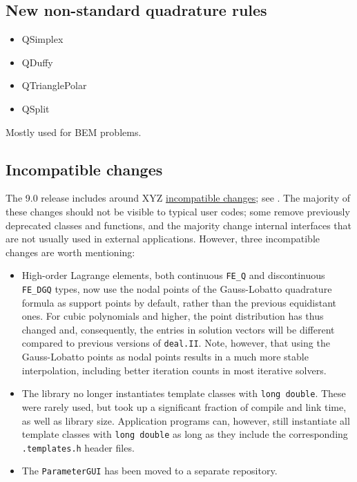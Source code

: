 \documentclass{ansarticle-preprint}
\newcommand{\specialword}[1]{\texttt{#1}}
\newcommand{\dealii}{{\specialword{deal.II}}}
\begin{document}
\subsection{New non-standard quadrature rules}

\begin{itemize}
\item QSimplex
\item QDuffy
\item QTrianglePolar
\item QSplit
\end{itemize}

Mostly used for BEM problems.

\subsection{Incompatible changes}

The 9.0 release includes around XYZ
\href{https://www.dealii.org/developer/doxygen/deal.II/changes_between_8_5_and_9_0.html}{
incompatible changes}; see \cite{changes90}. The majority of these changes
should not be visible to typical user codes; some remove previously
deprecated classes and functions, and the majority change internal
interfaces that are not usually used in external applications. However, three
incompatible changes are worth mentioning:
\begin{itemize}
  \item High-order Lagrange elements, both continuous \verb!FE_Q! and
    discontinuous \verb!FE_DGQ! types, now use the nodal points of the
    Gauss-Lobatto quadrature formula as support points by default, rather than the
    previous equidistant ones. For cubic polynomials and higher, the point
    distribution has thus changed and, consequently, the entries in
    solution vectors will be different compared to previous
    versions of \dealii{}. Note, however, that using the Gauss-Lobatto points as nodal
    points results in a much more stable interpolation, including better
    iteration counts in most iterative solvers.
  \item
    The library no longer instantiates template classes with \texttt{long
    double}. These were rarely used, but took up a significant
    fraction of compile and link time, as well as library
    size. Application programs can, however, still instantiate all
    template classes with \texttt{long
    double} as long as they include the corresponding \texttt{.templates.h}
    header files.
  \item
    The \texttt{ParameterGUI} has been moved to a separate repository.
\end{itemize}
\end{document}
